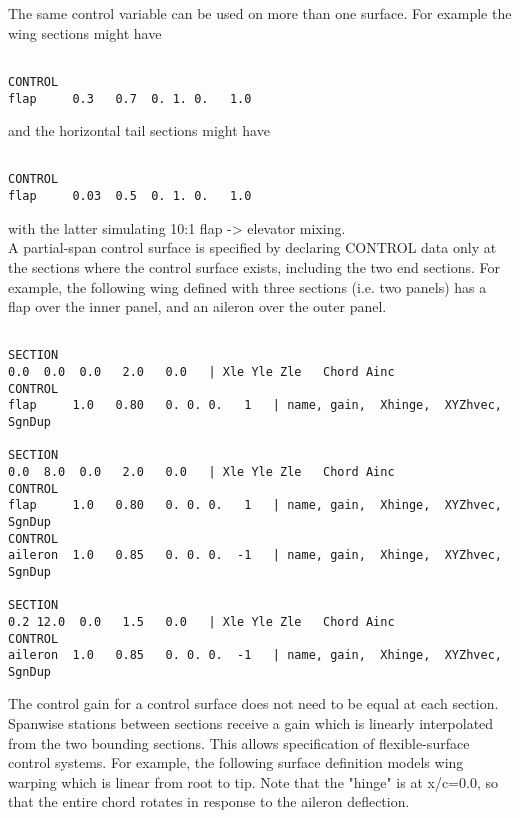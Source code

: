 The same control variable can be used on more than one surface.
For example the wing sections might have

\begin{lstlisting}

CONTROL                         
flap     0.3   0.7  0. 1. 0.   1.0

\end{lstlisting}

and the horizontal tail sections might have
\begin{lstlisting}

CONTROL                         
flap     0.03  0.5  0. 1. 0.   1.0

\end{lstlisting}


with the latter simulating 10:1 flap -> elevator mixing.\\

A partial-span control surface is specified by declaring
CONTROL data only at the sections where the control surface
exists, including the two end sections.  For example,
the following wing defined with three sections (i.e. two panels)
has a flap over the inner panel, and an aileron over the 
outer panel.
\begin{lstlisting}

SECTION
0.0  0.0  0.0   2.0   0.0   | Xle Yle Zle   Chord Ainc
CONTROL                         
flap     1.0   0.80   0. 0. 0.   1   | name, gain,  Xhinge,  XYZhvec,  SgnDup

SECTION
0.0  8.0  0.0   2.0   0.0   | Xle Yle Zle   Chord Ainc
CONTROL                         
flap     1.0   0.80   0. 0. 0.   1   | name, gain,  Xhinge,  XYZhvec,  SgnDup
CONTROL                         
aileron  1.0   0.85   0. 0. 0.  -1   | name, gain,  Xhinge,  XYZhvec,  SgnDup

SECTION
0.2 12.0  0.0   1.5   0.0   | Xle Yle Zle   Chord Ainc
CONTROL                         
aileron  1.0   0.85   0. 0. 0.  -1   | name, gain,  Xhinge,  XYZhvec,  SgnDup

\end{lstlisting}

The control gain for a control surface does not need to be equal
at each section.  Spanwise stations between sections receive a gain
which is linearly interpolated from the two bounding sections.
This allows specification of flexible-surface control systems.
For example, the following surface definition models wing warping
which is linear from root to tip.  Note that the "hinge" is at x/c=0.0, 
so that the entire chord rotates in response to the aileron deflection.

